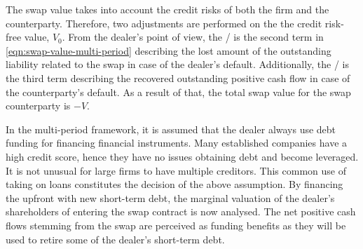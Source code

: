 \documentclass[main.tex]{subfiles}
\begin{document}
        The swap value takes into account the credit risks of both the firm and the counterparty.
        Therefore, two adjustments are performed on the the credit risk-free value, $V_0$.
        From the dealer's point of view,
        the \DVA/ is the second term in \cref{eqn:swap-value-multi-period} describing the lost amount of the outstanding liability related to the swap in case of the dealer's default.
        Additionally, the \CVA/ is the third term describing the recovered outstanding positive cash flow in case of the counterparty's default.
        As a result of that, the total swap value for the swap counterparty is $-V$.

        In the multi-period framework, it is assumed that the dealer always use debt funding for financing financial instruments.
        Many established companies have a high credit score,
        hence they have no issues obtaining debt and become leveraged.
        It is not unusual for large firms to have multiple creditors.
        This common use of taking on loans constitutes the decision of the above assumption.
        By financing the upfront with new short-term debt, the marginal valuation of the dealer's shareholders of entering the swap contract is now analysed.
        The net positive cash flows stemming from the swap are perceived as funding benefits as they will be used to retire some of the dealer's short-term debt.
        
\end{document}
